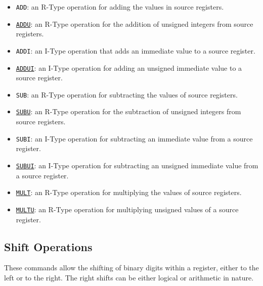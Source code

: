 \begin{itemize}%
	\item \texttt{ADD}: an R-Type operation for adding the values in source registers.
	\item \underline{\texttt{ADDU}}: an R-Type operation for the addition of unsigned integers from source registers.
	\item \texttt{ADDI}: an I-Type operation that adds an immediate value to a source register.
	\item \underline{\texttt{ADDUI}}: an I-Type operation for adding an unsigned immediate value to a source register.
	\item \texttt{SUB}: an R-Type operation for subtracting the values of source registers.
	\item \underline{\texttt{SUBU}}: an R-Type operation for the subtraction of unsigned integers from source registers.
	\item \texttt{SUBI}: an I-Type operation for subtracting an immediate value from a source register.
	\item \underline{\texttt{SUBUI}}: an I-Type operation for subtracting an unsigned immediate value from a source register.
	\item \underline{\texttt{MULT}}: an R-Type operation for multiplying the values of source registers.
	\item \underline{\texttt{MULTU}}: an R-Type operation for multiplying unsigned values of a source register.
\end{itemize}

\subsection{Shift Operations}
These commands allow the shifting of binary digits within a register, either to the left or to the right. The right shifts can be either logical or arithmetic in nature.

